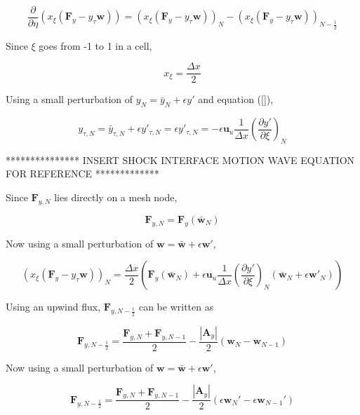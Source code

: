 \documentclass[10pt]{article}
\begin{document}
	$$ \frac{\partial}{\partial \eta} (x_\xi (\mathbf{F}_y - y_\tau \mathbf{w})) =  (x_\xi (\mathbf{F}_y - y_\tau \mathbf{w}))_{N} - (x_\xi (\mathbf{F}_y - y_\tau \mathbf{w}))_{N-\frac{1}{2}} $$
	
	Since $\xi$ goes from -1 to 1 in a cell,
	
	$$ x_{\xi}= \frac{\Delta x}{2} $$
	
	Using a small perturbation of $y_N = \bar{y}_N + \epsilon y'$ and equation (\ref{}), 
	
	$$ y_{\tau,N} = \bar{y}_{\tau,N} + \epsilon y'_{\tau,N} = \epsilon y'_{\tau,N} = - \epsilon \mathbf{u}_u \frac{1}{\Delta x} \left( \frac{\partial y'}{\partial \xi} \right)_N $$
	
	*************** INSERT SHOCK INTERFACE MOTION WAVE EQUATION FOR REFERENCE *************
	
	Since $\mathbf{F}_{y,N}$ lies directly on a mesh node,
	
	$$ \mathbf{F}_{y,N} = \mathbf{F}_{y}(\bar{\mathbf{w}}_N) $$
	
	Now using a small perturbation of $\mathbf{w} = \bar{\mathbf{w}} + \epsilon \mathbf{w}'$,
	
	
	
	\begin{equation} \label{shock_term2_pt1}
		(x_\xi (\mathbf{F}_y - y_\tau \mathbf{w}))_{N} = \frac{\Delta x}{2} \left( \mathbf{F}_{y}(\bar{\mathbf{w}}_N) + \epsilon \mathbf{u}_u \frac{1}{\Delta x} \left( \frac{\partial y'}{\partial \xi} \right)_N (\bar{\mathbf{w}}_N + \epsilon \mathbf{w}'_N) \right)
	\end{equation}
	
	
	Using an upwind flux, $\mathbf{F}_{y,N-\frac{1}{2}}$ can be written as
	
	$$ \mathbf{F}_{y,N-\frac{1}{2}} = \frac{\mathbf{F}_{y,N} + \mathbf{F}_{y,N-1}}{2} - \frac{|\mathbf{A}_y|}{2}(\mathbf{w}_{N} - \mathbf{w}_{N-1})$$
	
	Now using a small perturbation of $\mathbf{w} = \bar{\mathbf{w}} + \epsilon \mathbf{w}'$, 
	
	$$ \mathbf{F}_{y,N-\frac{1}{2}} = \frac{\mathbf{F}_{y,N} + \mathbf{F}_{y,N-1}}{2} - \frac{|\mathbf{A}_y|}{2} (\epsilon \mathbf{w}_{N}' - \epsilon \mathbf{w}_{N-1}')$$
	
\end{document}
